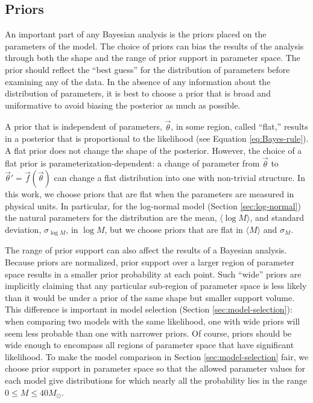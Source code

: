 \documentclass[preprint]{aastex}
\newcommand{\Msun}{M_\odot}
\newcommand{\vtheta}{\vec{\theta}}
\begin{document}
\subsection{Priors}
\label{sec:priors}

An important part of any Bayesian analysis is the priors placed on the
parameters of the model.  The choice of priors can bias the results of
the analysis through both the shape and the range of prior support in
parameter space.  The prior should reflect the ``best guess'' for the
distribution of parameters before examining any of the data.  In the
absence of any information about the distribution of parameters, it is
best to choose a prior that is broad and uniformative to avoid biasing
the posterior as much as possible.

A prior that is independent of parameters, $\vtheta$, in some region,
called ``flat,'' results in a posterior that is proportional to the
likelihood (see Equation \eqref{eq:Bayes-rule}).  A flat prior does
not change the shape of the posterior.  However, the choice of a flat
prior is parameterization-dependent: a change of parameter from
$\vtheta$ to $\vtheta' = \vec{f}(\vtheta)$ can change a flat
distribution into one with non-trivial structure.  In this work, we
choose priors that are flat when the parameters are measured in
physical units.  In particular, for the log-normal model (Section
\ref{sec:log-normal}) the natural parameters for the distribution are
the mean, $\langle \log M \rangle$, and standard deviation,
$\sigma_{\log M}$, in $\log M$, but we choose priors that are flat in
$\langle M \rangle$ and $\sigma_M$.

The range of prior support can also affect the results of a Bayesian
analysis.  Because priors are normalized, prior support over a larger
region of parameter space results in a smaller prior probability at
each point.  Such ``wide'' priors are implicitly claiming that any
particular sub-region of parameter space is less likely than it would
be under a prior of the same shape but smaller support volume.  This
difference is important in model selection (Section
\ref{sec:model-selection}): when comparing two models with the same
likelihood, one with wide priors will seem less probable than one with
narrower priors.  Of course, priors should be wide enough to encompass
all regions of parameter space that have significant likelihood.  To
make the model comparison in Section \ref{sec:model-selection} fair,
we choose prior support in parameter space so that the allowed
parameter values for each model give distributions for which nearly
all the probability lies in the range $0 \leq M \leq 40 \Msun$.
\end{document}
